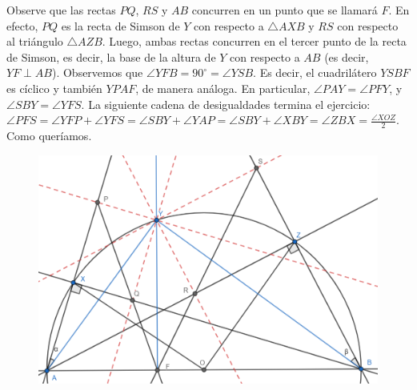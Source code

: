 \begin{sol}
	Observe que las rectas $PQ$, $RS$ y $AB$ concurren en un punto que se llamar\'a $F$. En efecto, $PQ$ es la recta de Simson de $Y$ con respecto a $\triangle AXB$ y $RS$ con respecto al tri\'angulo $\triangle AZB$. Luego, ambas rectas concurren en el tercer punto de la recta de Simson, es decir, la base de la altura de $Y$ con respecto a $AB$ (es decir, $YF \perp AB$). Observemos que $\angle YFB = 90^{\circ} = \angle YSB$. Es decir, el cuadril\'atero $YSBF$ es c\'iclico y tambi\'en  $YPAF$, de manera an\'aloga. En particular, $\angle PAY = \angle PFY$, y $\angle SBY = \angle YFS$. La siguiente cadena de desigualdades termina el ejercicio: $\angle PFS = \angle YFP + \angle YFS = \angle SBY + \angle YAP = \angle SBY + \angle XBY = \angle ZBX = \frac{\angle XOZ}{2}$. Como quer\'iamos. 
	
	\begin{figure} [h!]
		\centering
		\includegraphics[scale=0.4]{Imgs/JT6.png}
	\end{figure}

	
\end{sol}




